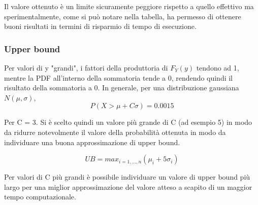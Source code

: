 Il valore ottenuto è un limite sicuramente peggiore rispetto a quello effettivo ma sperimentalmente, come si può notare nella tabella, ha permesso di ottenere buoni risultati in termini di risparmio di tempo di esecuzione.


\subsubsection{Upper bound}

Per valori di y "grandi", i fattori della produttoria di $F_Y(y)$ tendono ad 1, mentre la PDF all'interno della sommatoria tende a 0, rendendo quindi il risultato della sommatoria a 0. In generale, per una distribuzione gaussiana $N(\mu, \sigma)$, 
$$P(X > \mu + C \sigma) = 0.0015$$

Per C = 3. Si è scelto quindi un valore più grande di C (ad esempio 5) in modo da ridurre notevolmente il valore della probabilità ottenuta in modo da individuare una buona approssimazione di upper bound.

$$UB = max_{i=1,...,n}(\mu_i + 5 \sigma_i) $$

Per valori di C più grandi è possibile individuare un valore di upper bound più largo per una miglior approssimazione del valore atteso a scapito di un maggior tempo computazionale.



